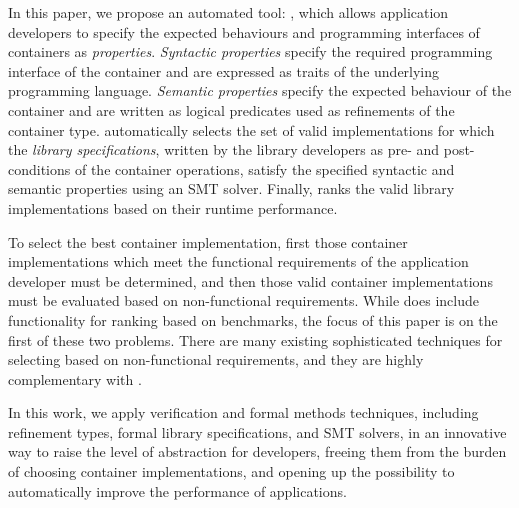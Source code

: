 In this paper, we propose an automated tool: \Primrose{}, which allows application developers to specify the expected behaviours and programming interfaces of containers as \emph{properties}.
\emph{Syntactic properties} specify the required programming interface of the container and are expressed as traits of the underlying programming language.
\emph{Semantic properties} specify the expected behaviour of the container and are written as logical predicates used as refinements of the container type.
\Primrose{} automatically selects the set of valid implementations for which the \emph{library specifications}, written by the library developers as pre- and post-conditions of the container operations, satisfy the specified syntactic and semantic properties using an SMT solver.
Finally, \Primrose{} ranks the valid library implementations based on 
their runtime performance.

To select the best container implementation, first those container implementations which meet the functional requirements of the application developer must be determined, and then those valid container implementations must be evaluated based on non-functional requirements. While \Primrose{} does include functionality for ranking based on benchmarks, the focus of this paper is on the first of these two problems. There are many existing sophisticated techniques for selecting based on non-functional requirements, and they are highly complementary with \Primrose{}.

In this work, we apply verification and formal methods techniques, including refinement types, formal library specifications, and SMT solvers, in an innovative way to raise the level of abstraction for developers, freeing them from the burden of choosing container implementations, and opening up the possibility to automatically improve the performance of applications.

